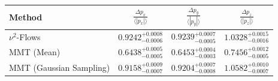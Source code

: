     \begin{tabular}{lccc}
        \toprule
        Method & $\frac{\Delta p_x}{\langle |p_x|\rangle}$ & $\frac{\Delta p_y}{\langle |p_y|\rangle}$ & $\frac{\Delta p_z}{\langle |p_z|\rangle}$ \\
        \midrule
        $\nu^2$-Flows & $0.9242^{+0.0008}_{-0.0006}$ & $0.9239^{+0.0007}_{-0.0005}$ & $1.0328^{+0.0015}_{-0.0016}$ \\
        MMT (Mean) & $0.6438^{+0.0005}_{-0.0005}$ & $0.6453^{+0.0004}_{-0.0003}$ & $0.7456^{+0.0012}_{-0.0005}$ \\
        MMT (Gaussian Sampling) & $0.9158^{+0.0009}_{-0.0007}$ & $0.9204^{+0.0007}_{-0.0008}$ & $1.0582^{+0.0010}_{-0.0007}$ \\
        \bottomrule
    \end{tabular}